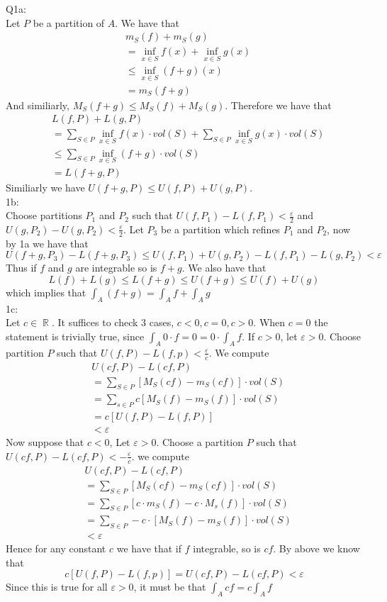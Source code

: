 \documentclass[letterpaper]{article}
\DeclareMathOperator{\R}{\mathbb{R}}
\begin{document}
Q1a: \\
Let $P$ be a partition of $A$. We have that 
\begin{align*}
    & m_S(f)+m_S(g) 
    \\ & = \inf_{x\in S} f(x) +  \inf_{x\in S} g(x)
    \\ & \leq \inf_{x\in S} (f+g)(x) \tag*{by discussion in lecture 25}
    \\ & = m_S(f+g)
\end{align*}
 And similiarly, $M_S(f+g) \leq M_S(f) + M_S(g)$. Therefore we have that 
\begin{align*}
    & L(f,P) + L(g,P) 
    \\ & = \sum_{S\in P} \inf_{x\in S} f(x) \cdot vol(S) + \sum_{S\in P} \inf_{x\in S} g(x) \cdot vol(S)
    \\ & \leq \sum_{S\in P} \inf_{x\in S}(f+g) \cdot vol(S) 
    \\ & = L(f+g,P)
\end{align*}
Similiarly we have $U(f+g,P)\leq U(f,P) + U(g,P)$. 
\\ 1b: \\ 
Choose partitions $P_1$ and $P_2$ such that $U(f,P_1)-L(f,P_1) < \frac{\varepsilon}{2}$ and $U(g,P_2)- U(g,P_2) < \frac{\varepsilon}{2}$. Let $P_3$ be a partition which refines $P_1$ and $P_2$, now by 1a we have that 
$$U(f+g,P_3) - L(f+g,P_3) \leq U(f,P_1) + U(g,P_2) - L(f,P_1) - L(g,P_2) < \varepsilon$$ Thus if $f$ and $g$ are integrable so is $f+g$. We also have that 
$$L(f)+ L(g) \leq L(f+g) \leq U(f+g) \leq U(f) + U(g)$$ which implies that $\int_A (f+g) = \int_A f + \int_A g$
\\ 1c: \\ Let $c\in \R$. It suffices to check 3 cases, $c <0,c=0,c>0$. When $c=0$ the statement is trivially true, since $\int_A 0\cdot f = 0 = 0\cdot \int_A f$. If $c>0$,  let $\varepsilon >0$. Choose partition $P$ such that $U(f,P)-L(f,p) < \frac{\varepsilon}{c}$. We compute 
\begin{align*}
& U(cf,P)- L(cf,P)
\\ & = \sum_{S\in P} [M_S(cf) - m_S(cf)] \cdot vol(S)
\\ & = \sum_{s\in P}c [M_S(f)-m_S(f)]\cdot vol(S)
\\ & = c [U(f,P)-L(f,P)]
\\ & < \varepsilon
\end{align*}Now suppose that $c<0$, Let $\varepsilon >0$. Choose a partition $P$ such that $U(cf,P)-L(cf,P)< - \frac{\varepsilon}{c}$. we compute 
\begin{align*}
    & U(cf,P)- L(cf,P)
    \\ & = \sum_{S\in P}[M_S(cf)-m_S(cf)]\cdot vol(S)
    \\ & = \sum_{S\in P}[c\cdot m_S(f)-c \cdot M_s(f)]\cdot vol(S) \tag*{since multiplying by c below 0 swaps sup and inf}
    \\ & = \sum_{S\in P } -c \cdot [M_S(f)-m_S(f)]\cdot vol(S)
    \\ & < \varepsilon
\end{align*} Hence for any constant $c$ we have that if $f$ integrable, so is $cf$. By above we know that 
$$c[U(f,P)-L(f,p)]= U(cf,P)-L(cf,P)< \varepsilon$$ Since this is true for all $\varepsilon>0$, it must be that $\int_A cf = c \int_A f$
\end{document}
